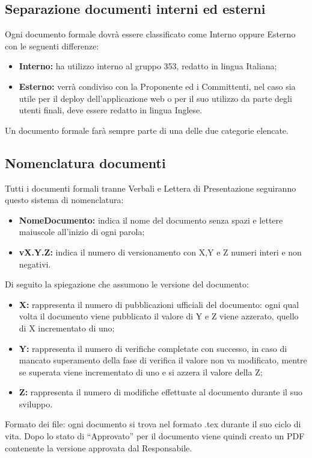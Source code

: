 \documentclass[NormeDiProgetto.tex]{subfiles}
\begin{document}
	\subsection{Separazione documenti interni ed esterni}
	Ogni documento formale dovrà essere classificato come Interno
	oppure Esterno con le seguenti differenze:
	\begin{itemize}
		\item \textbf{Interno:} ha utilizzo interno al gruppo 353, redatto in lingua Italiana;
		\item \textbf{Esterno:} verrà condiviso con la Proponente ed i Committenti, nel caso sia utile per il deploy dell'applicazione web o per il suo utilizzo da parte degli utenti finali, deve essere redatto in lingua Inglese.
	\end{itemize}
	Un documento formale farà sempre parte di una delle due categorie elencate.
	
	\subsection{Nomenclatura documenti}
	Tutti i documenti formali tranne Verbali e Lettera di Presentazione seguiranno questo sistema di nomenclatura:

	\begin{itemize}
		\item\textbf{ NomeDocumento:} indica il nome del documento senza spazi e lettere maiuscole all'inizio di ogni parola;
		\item \textbf{vX.Y.Z:} indica il numero di versionamento con X,Y e Z numeri interi e non negativi.	
	\end{itemize}
	Di seguito la spiegazione che assumono le versione del documento:
	\begin{itemize}
		\item \textbf{X:} rappresenta il numero di pubblicazioni ufficiali del documento: ogni qual volta il documento viene pubblicato il valore di Y e Z viene azzerato, quello di X incrementato di uno;
		\item \textbf{Y:} rappresenta il numero di verifiche completate con successo, in caso di mancato superamento della fase di verifica il valore non va modificato, mentre se superata viene incrementato di uno e si azzera il valore della Z;
		\item \textbf{Z:} rappresenta il numero di modifiche effettuate al documento durante il suo sviluppo.	
	\end{itemize}
	Formato dei file: ogni documento si trova nel formato .tex durante il suo ciclo di vita.
	Dopo lo stato di “Approvato” per il documento viene quindi creato un PDF contenente la versione approvata dal Responsabile.
	
\end{document}
